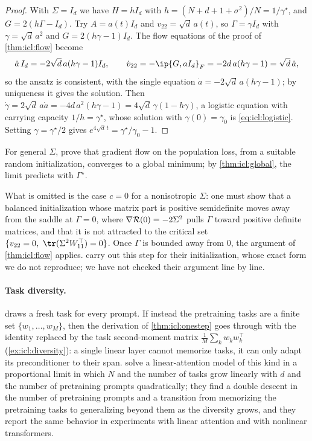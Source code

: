 \begin{refsection}
\begin{proof}
With $\Sigma=I_d$ we have $H=hI_d$ with $h=(N+d+1+\sigma^2)/N=1/\gamma^\star$, and $G=2(h\Gamma-I_d)$. Try $A=a(t)I_d$ and $v_{22}=\sqrt d\,a(t)$, so $\Gamma=\gamma I_d$ with $\gamma=\sqrt d\,a^2$ and $G=2(h\gamma-1)I_d$. The flow equations of the proof of \cref{thm:icl:flow} become
\[
  \dot a\,I_d=-2\sqrt d\,a(h\gamma-1)I_d,\qquad \dot v_{22}=-\ip{G,aI_d}_F=-2d\,a(h\gamma-1)=\sqrt d\,\dot a ,
\]
so the ansatz is consistent, with the single equation $\dot a=-2\sqrt d\,a(h\gamma-1)$; by uniqueness it gives the solution. Then $\dot\gamma=2\sqrt d\,a\dot a=-4d\,a^2(h\gamma-1)=4\sqrt d\,\gamma(1-h\gamma)$, a logistic equation with carrying capacity $1/h=\gamma^\star$, whose solution with $\gamma(0)=\gamma_0$ is \eqref{eq:icl:logistic}. Setting $\gamma=\gamma^\star/2$ gives $e^{4\sqrt d\,t}=\gamma^\star/\gamma_0-1$.
\end{proof}

For general $\Sigma$, \textcite{ZhangFreiBartlett2024} prove that gradient flow on the population loss, from a suitable random initialization, converges to a global minimum; by \cref{thm:icl:global}, the limit predicts with $\Gamma^\star$.

\begin{proofsketch}
What is omitted is the case $c=0$ for a nonisotropic $\Sigma$: one must show that a balanced initialization whose matrix part is positive semidefinite moves away from the saddle at $\Gamma=0$, where $\nabla\mathcal{R}(0)=-2\Sigma^2$ pulls $\Gamma$ toward positive definite matrices, and that it is not attracted to the critical set $\{v_{22}=0,\ \tr(\Sigma^2W_{11}^\top)=0\}$. Once $\Gamma$ is bounded away from $0$, the argument of \cref{thm:icl:flow} applies. \Textcite{ZhangFreiBartlett2024} carry out this step for their initialization, whose exact form we do not reproduce; we have not checked their argument line by line.
\end{proofsketch}

\paragraph{Task diversity.}  draws a fresh task for every prompt. If instead the pretraining tasks are a finite set $\{w_1,\dots,w_M\}$, then the derivation of \cref{thm:icl:onestep} goes through with the identity replaced by the task second-moment matrix $\frac1M\sum_kw_kw_k^\top$ (\cref{ex:icl:diversity}): a single linear layer cannot memorize tasks, it can only adapt its preconditioner to their span. \Textcite{LuEtAl2025} solve a linear-attention model of this kind in a proportional limit in which $N$ and the number of tasks grow linearly with $d$ and the number of pretraining prompts quadratically; they find a double descent in the number of pretraining prompts and a transition from memorizing the pretraining tasks to generalizing beyond them as the diversity grows, and they report the same behavior in experiments with linear attention and with nonlinear transformers.


\end{refsection}
